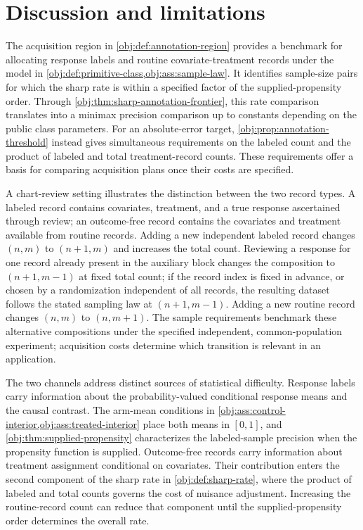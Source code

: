 \section{Discussion and limitations}\label{sec:discussion}

The acquisition region in \cref{obj:def:annotation-region} provides a benchmark for allocating response labels and routine covariate-treatment records under the model in \cref{obj:def:primitive-class,obj:ass:sample-law}. It identifies sample-size pairs for which the sharp rate is within a specified factor of the supplied-propensity order. Through \cref{obj:thm:sharp-annotation-frontier}, this rate comparison translates into a minimax precision comparison up to constants depending on the public class parameters. For an absolute-error target, \cref{obj:prop:annotation-threshold} instead gives simultaneous requirements on the labeled count and the product of labeled and total treatment-record counts. These requirements offer a basis for comparing acquisition plans once their costs are specified.

A chart-review setting illustrates the distinction between the two record types. A labeled record contains covariates, treatment, and a true response ascertained through review; an outcome-free record contains the covariates and treatment available from routine records. Adding a new independent labeled record changes \((n,m)\) to \((n+1,m)\) and increases the total count. Reviewing a response for one record already present in the auxiliary block changes the composition to \((n+1,m-1)\) at fixed total count; if the record index is fixed in advance, or chosen by a randomization independent of all records, the resulting dataset follows the stated sampling law at \((n+1,m-1)\). Adding a new routine record changes \((n,m)\) to \((n,m+1)\). The sample requirements benchmark these alternative compositions under the specified independent, common-population experiment; acquisition costs determine which transition is relevant in an application.

The two channels address distinct sources of statistical difficulty. Response labels carry information about the probability-valued conditional response means and the causal contrast. The arm-mean conditions in \cref{obj:ass:control-interior,obj:ass:treated-interior} place both means in \([0,1]\), and \cref{obj:thm:supplied-propensity} characterizes the labeled-sample precision when the propensity function is supplied. Outcome-free records carry information about treatment assignment conditional on covariates. Their contribution enters the second component of the sharp rate in \cref{obj:def:sharp-rate}, where the product of labeled and total counts governs the cost of nuisance adjustment. Increasing the routine-record count can reduce that component until the supplied-propensity order determines the overall rate.

